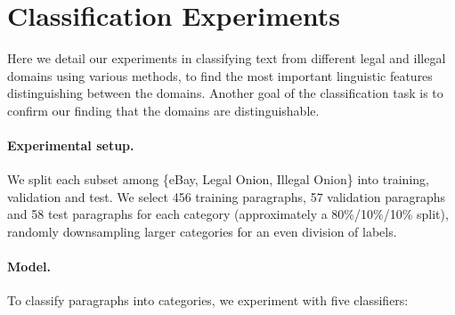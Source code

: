 \documentclass[11pt,a4paper,table]{article}
\begin{document}
\section{Classification Experiments} \label{sec:classification}

  Here we detail our experiments in classifying text from different legal and
  illegal domains using various methods, to find the most important linguistic features
  distinguishing between the domains. Another goal of the classification task is to confirm our finding that the domains are distinguishable.

\paragraph{Experimental setup.}

We split each subset among
\{eBay, Legal Onion, Illegal Onion\}
into training, validation and test.
We select 456 training paragraphs, 57 validation paragraphs and
58 test paragraphs for each category (approximately a 80\%/10\%/10\% split),
randomly downsampling larger categories for an even division of labels.

\paragraph{Model.}

To classify paragraphs into categories, we experiment with five classifiers:
\end{document}
